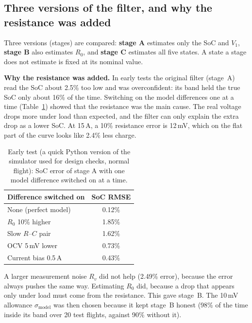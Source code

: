 \subsection{Three versions of the filter, and why the resistance was added}\label{sec:m_ekf_stages}\label{sec:m_ekf_investigation}

Three versions (stages) are compared: \textbf{stage A} estimates only the SoC and $V_1$, \textbf{stage B} also estimates $R_0$, and \textbf{stage C} estimates all five states. A state a stage does not estimate is fixed at its nominal value.

\textbf{Why the resistance was added.} In early tests the original filter (stage~A) read the SoC about 2.5\% too low and was overconfident: its band held the true SoC only about 16\% of the time. Switching on the model differences one at a time (Table~\ref{tab:m_ablation}) showed that the resistance was the main cause. The real voltage drops more under load than expected, and the filter can only explain the extra drop as a lower SoC. At 15\,A, a 10\% resistance error is 12\,mV, which on the flat part of the curve looks like 2.4\% less charge.

\begin{table}[htbp]
  \centering
  \caption{Early test (a quick Python version of the simulator used for design checks, normal flight): SoC error of stage A with one model difference switched on at a time.}
  \label{tab:m_ablation}
  \small
  \begin{tabular}{@{}lc@{}}
    \toprule
    Difference switched on & SoC RMSE \\
    \midrule
    None (perfect model) & 0.12\% \\
    $R_0$ 10\% higher & 1.85\% \\
    Slow $R$--$C$ pair & 1.62\% \\
    OCV 5\,mV lower & 0.73\% \\
    Current bias 0.5\,A & 0.43\% \\
    \bottomrule
  \end{tabular}
\end{table}

A larger measurement noise $R_v$ did not help (2.49\% error), because the error always pushes the same way. Estimating $R_0$ did, because a drop that appears only under load must come from the resistance. This gave stage~B. The 10\,mV allowance $\sigma_{\text{model}}$ was then chosen because it kept stage~B honest (98\% of the time inside its band over 20 test flights, against 90\% without it).

